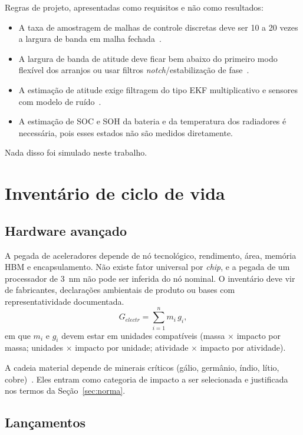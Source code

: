 \documentclass[11pt,a4paper]{article}
\begin{document}
Regras de projeto, apresentadas como requisitos e não como resultados:
\begin{itemize}
  \item A taxa de amostragem de malhas de controle discretas deve ser 10 a 20
  vezes a largura de banda em malha fechada~\cite{r32}.
  \item A largura de banda de atitude deve ficar bem abaixo do primeiro modo
  flexível dos arranjos ou usar filtros \emph{notch}/estabilização de
  fase~\cite{r27}.
  \item A estimação de atitude exige filtragem do tipo EKF multiplicativo e
  sensores com modelo de ruído~\cite{r31,r49}.
  \item A estimação de SOC e SOH da bateria e da temperatura dos radiadores é
  necessária, pois esses estados não são medidos diretamente.
\end{itemize}
Nada disso foi simulado neste trabalho.

\section{Inventário de ciclo de vida}

\subsection{Hardware avançado}

A pegada de aceleradores depende de nó tecnológico, rendimento, área, memória
HBM e encapsulamento. Não existe fator universal por \emph{chip}, e a pegada de
um processador de 3~nm não pode ser inferida do nó nominal. O inventário deve
vir de fabricantes, declarações ambientais de produto ou bases com
representatividade documentada.
\begin{equation}
  G_{electr}=\sum_{i=1}^{n} m_i\,g_i,
  \label{eq:gelectr}
\end{equation}
em que $m_i$ e $g_i$ devem estar em unidades compatíveis (massa $\times$
impacto por massa; unidades $\times$ impacto por unidade; atividade $\times$
impacto por atividade).

A cadeia material depende de minerais críticos (gálio, germânio, índio, lítio,
cobre)~\cite{r21}. Eles entram como categoria de impacto a ser selecionada e
justificada nos termos da Seção~\ref{sec:norma}.

\subsection{Lançamentos}\label{sec:lanc}
\end{document}
